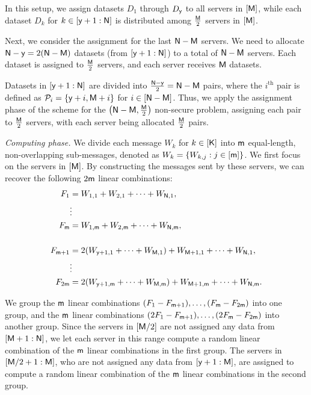 \documentclass[conference,letterpaper]{IEEEtran}
\begin{document}
In this setup, we assign datasets $D_1$ through $D_{{\sf y}}$ to all servers in $[{\sf M}]$, while each dataset $D_k$ for $k \in [{\sf y}+1 : {\sf N}]$ is distributed among $\frac{{\sf M}}{2}$ servers in $[{\sf M}]$.

Next, we consider the assignment for the last ${\sf N}-{\sf M}$ servers.
We need to allocate ${\sf N}-{\sf y} = 2({\sf N}-{\sf M})$ datasets (from $[{\sf y}+1 : {\sf N}]$) to a total of ${\sf N}-{\sf M}$ servers. Each dataset is assigned to $\frac{{\sf M}}{2}$ servers, and each server receives ${\sf M}$ datasets. 

Datasets in $[{\sf y}+1 : {\sf N}]$ are divided into $\frac{{\sf N}-{\sf y}}{2} = {\sf N}-{\sf M}$ pairs, where the $i^{\text{th}}$ pair is defined as ${\cal P}_i = \{{\sf y}+i, {\sf M}+i\}$ for $i \in [{\sf N}-{\sf M}]$. Thus, we apply the assignment phase of the scheme for the $\left({\sf N}-{\sf M}, \frac{{\sf M}}{2}\right)$ non-secure problem, assigning each pair to $\frac{{\sf M}}{2}$ servers, with each server being allocated $\frac{{\sf M}}{2}$ pairs.

{\it Computing phase.}
We divide each message $W_k$ for $k \in [{\sf K}]$ into ${\sf m}$ equal-length, non-overlapping sub-messages, denoted as $W_k = \{W_{k,j} : j \in [{\sf m}]\}$.
We first focus on the servers in $[{\sf M}]$. By constructing the messages sent by these servers, we can recover the following $2{\sf m}$ linear combinations:
\begin{align*}
    F_1 &= W_{1,1} + W_{2,1} + \cdots + W_{{\sf N},1}, \\
    &\vdots \\
    F_{{\sf m}} &= W_{1,{\sf m}} + W_{2,{\sf m}} + \cdots + W_{{\sf N},{\sf m}}, \\
    \\
    F_{{\sf m}+1} &= 2(W_{{\sf y}+1,1} + \cdots + W_{{\sf M},1}) + W_{{\sf M}+1,1} + \cdots + W_{{\sf N},1}, \\
    &\vdots \\
    F_{2{\sf m}} &= 2(W_{{\sf y}+1,{\sf m}} + \cdots + W_{{\sf M},{\sf m}}) + W_{{\sf M}+1,{\sf m}} + \cdots + W_{{\sf N},{\sf m}}.
\end{align*}

We group the ${\sf m}$ linear combinations $(F_1 - F_{{\sf m}+1}), \ldots, (F_{{\sf m}} - F_{2{\sf m}})$ into one group, and the ${\sf m}$ linear combinations $(2F_1 - F_{{\sf m}+1}), \ldots, (2F_{{\sf m}} - F_{2{\sf m}})$ into another group. Since the servers in $[{\sf M}/2]$ are not assigned any data from $[{\sf M}+1: {\sf N}]$, we let each server in this range compute a random linear combination of the ${\sf m}$ linear combinations in the first group. The servers in $[{\sf M}/2+1: {\sf M}]$, who are not assigned any data from $[{\sf y}+1: {\sf M}]$, are assigned to compute a random linear combination of the ${\sf m}$ linear combinations in the second group.
\end{document}

